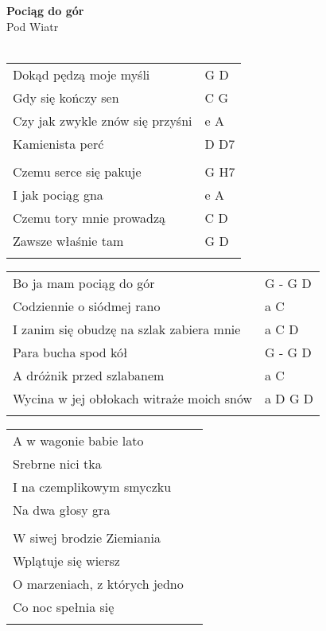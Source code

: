 \documentclass[a5paper]{article}
\begin{document}


\noindent
\fontsize{12pt}{15pt}\selectfont
\textbf{Pociąg do gór} \\
\fontsize{8pt}{10pt}\selectfont
Pod Wiatr \\ \\
\fontsize{10pt}{12pt}\selectfont
{}
\begin{tabular}{@{}p{8.50cm}p{3cm}@{}}
\noindent
Dokąd pędzą moje myśli & G D \\
Gdy się kończy sen & C G \\
Czy jak zwykle znów się przyśni & e A \\
Kamienista perć & D D7  \\ \\

Czemu serce się pakuje & G H7 \\
I jak pociąg gna & e A \\
Czemu tory mnie prowadzą & C D \\
Zawsze właśnie tam & G D \\ \\
\end{tabular}

\noindent
\begin{tabular}{@{}p{7.50cm}p{3cm}@{}}
Bo ja mam pociąg do gór & G - G D \\
Codziennie o siódmej rano & a C \\
I zanim się obudzę na szlak zabiera mnie & a C D \\
 
Para bucha spod kół & G - G D \\
A dróżnik przed szlabanem & a C \\
Wycina w jej obłokach witraże moich snów & a D G D \\ \\
\end{tabular}

\noindent
\begin{tabular}{@{}p{7.50cm}p{3cm}@{}}
A w wagonie babie lato \\
Srebrne nici tka \\
I na czemplikowym smyczku \\
Na dwa głosy gra \\ \\
 
W siwej brodzie Ziemiania \\
Wplątuje się wiersz \\
O marzeniach, z których jedno \\
Co noc spełnia się \\ \\
\end{tabular}
\end{document}
